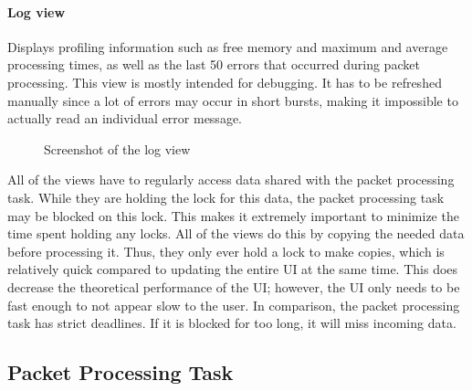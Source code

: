 \paragraph{Log view}

Displays profiling information such as free memory and maximum and average processing times, as well
as the last 50 errors that occurred during packet processing. This view is mostly intended for debugging.
It has to be refreshed manually since a lot of errors may occur in short bursts, making it impossible
to actually read an individual error message.

\begin{figure}[H]
    \centering
    \setlength{\fboxsep}{0mm}
    \caption{Screenshot of the log view}
\end{figure}

All of the views have to regularly access data shared with the packet processing task. While they
are holding the lock for this data, the packet processing task may be blocked on this lock. This
makes it extremely important to minimize the time spent holding any locks. All of the views do this
by copying the needed data before processing it. Thus, they only ever hold a lock to make copies,
which is relatively quick compared to updating the entire UI at the same time. This does decrease
the theoretical performance of the UI; however, the UI only needs to be fast enough to not appear
slow to the user. In comparison, the packet processing task has strict deadlines. If it is blocked
for too long, it will miss incoming data.

\subsection{Packet Processing Task}
\label{implementation/software/packet-processing-task}

